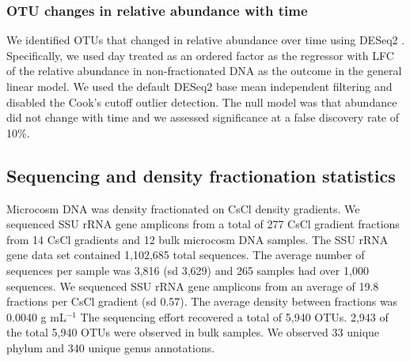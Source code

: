 \documentclass{article}
\begin{document}
\subsubsection{OTU changes in relative abundance with time}
We identified OTUs that changed in relative abundance over time using
DESeq2 \citep{love2014}. Specifically, we used day treated as an ordered
factor as the regressor with LFC of the relative abundance in
non-fractionated DNA as the outcome in the general linear model. We used
the default DESeq2 base mean independent filtering and disabled the Cook's
cutoff outlier detection. The null model was that abundance did not change
with time and we assessed significance at a false discovery rate of 10\%. 

\subsection{Sequencing and density fractionation statistics}\label{seq_stats}
Microcosm DNA was density fractionated on CsCl density gradients. We sequenced
SSU rRNA gene amplicons from a total of 277 CsCl gradient fractions from 14
CsCl gradients and 12 bulk microcosm DNA samples. The SSU rRNA gene data set
contained 1,102,685 total sequences. The average number of sequences per sample
was 3,816 (sd 3,629) and 265 samples had over 1,000 sequences. We sequenced SSU
rRNA gene amplicons from an average of 19.8 fractions per CsCl gradient (sd
0.57). The average density between fractions was  0.0040 g mL$^{-1}$ The
sequencing effort recovered a total of 5,940 OTUs. 2,943 of the total 5,940
OTUs were observed in bulk samples. We observed 33 unique phylum and 340 unique
genus annotations.


\end{document}
